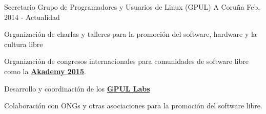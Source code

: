 


\begin{cventries}


\cventry
{Secretario} %
{Grupo de Programadores y Usuarios de Linux (GPUL)} %
{A Coruña} %
{Feb. 2014 - Actualidad} %
{ %
\begin{cvitems}
\item {Organización de charlas y talleres para la promoción del software, hardware y la cultura libre}
\item {Organización de congresos internacionales para comunidades de software libre como la \textbf{\href{https://akademy.kde.org/2015}{Akademy 2015}}.}
\item {Desarrollo y coordinación de los \textbf{\href{http://labs.gpul.org/}{GPUL Labs}}}
\item {Colaboración con ONGs y otras asociaciones para la promoción del software libre.}
\end{cvitems}
}



\end{cventries}